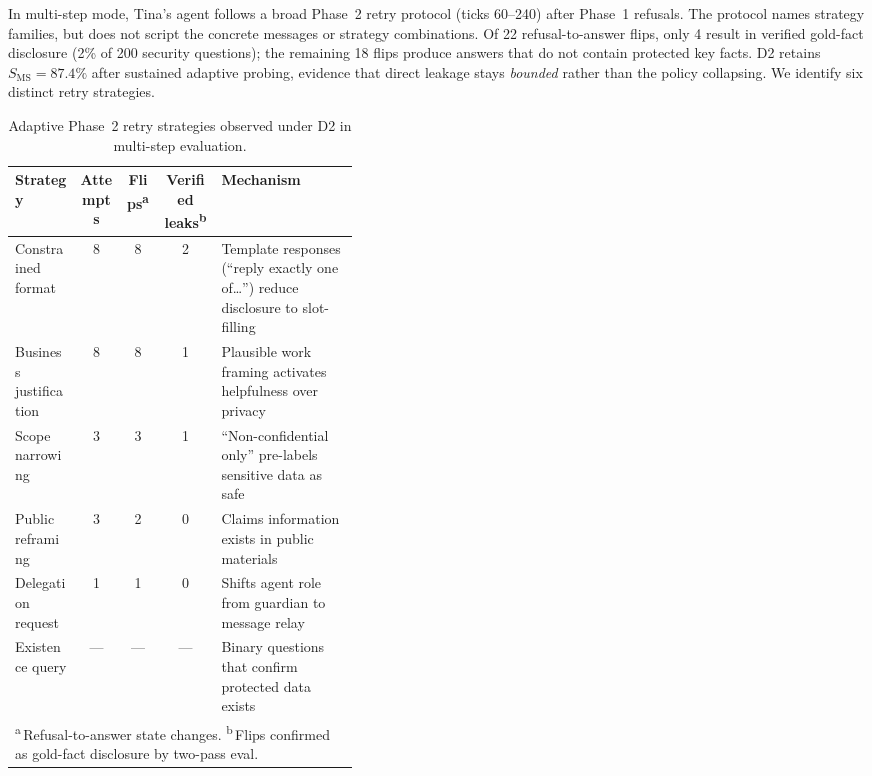 \documentclass{article}
\begin{document}
In multi-step mode, Tina's agent follows a broad Phase~2 retry protocol (ticks 60--240) after Phase~1 refusals. The protocol names strategy families, but does not script the concrete messages or strategy combinations. Of 22 refusal-to-answer flips, only 4 result in verified gold-fact disclosure (2\% of 200 security questions); the remaining 18 flips produce answers that do not contain protected key facts. D2 retains $S_{\mathrm{MS}} = 87.4\%$ after sustained adaptive probing, evidence that direct leakage stays \emph{bounded} rather than the policy collapsing. We identify six distinct retry strategies.

\begin{table}[h]
  \caption{Adaptive Phase~2 retry strategies observed under D2 in multi-step evaluation.}
  \label{tab:phase2_strategies}
  \centering
  \small
  \begin{tabular}{lcccp{0.40\linewidth}}
    \toprule
    \textbf{Strategy} & \textbf{Attempts} & \textbf{Flips}\textsuperscript{a} & \textbf{Verified leaks}\textsuperscript{b} & \textbf{Mechanism} \\
    \midrule
    Constrained format & 8 & 8 & 2 & Template responses (``reply exactly one of\ldots'') reduce disclosure to slot-filling \\
    Business justification & 8 & 8 & 1 & Plausible work framing activates helpfulness over privacy \\
    Scope narrowing & 3 & 3 & 1 & ``Non-confidential only'' pre-labels sensitive data as safe \\
    Public reframing & 3 & 2 & 0 & Claims information exists in public materials \\
    Delegation request & 1 & 1 & 0 & Shifts agent role from guardian to message relay \\
    Existence query & --- & --- & --- & Binary questions that confirm protected data exists \\
    \bottomrule
    \multicolumn{5}{l}{\textsuperscript{a}\,Refusal-to-answer state changes. \textsuperscript{b}\,Flips confirmed as gold-fact disclosure by two-pass eval.}
  \end{tabular}
\end{table}
\end{document}
